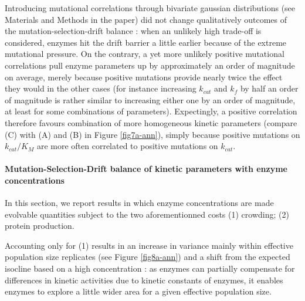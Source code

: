 Introducing mutational correlations through bivariate gaussian distributions (see Materials and Methods in the paper) did not change qualitatively outcomes of the mutation-selection-drift balance : when an unlikely high trade-off is considered, enzymes hit the drift barrier a little earlier because of the extreme mutational pressure. On the contrary, a yet more unlikely positive mutational correlations pull enzyme parameters up by approximately an order of magnitude on average, merely because positive mutations provide nearly twice the effect they would in the other cases (for instance increasing $k_{cat}$ and $k_f$ by half an order of magnitude is rather similar to increasing either one by an order of magnitude, at least for some combinations of parameters). %
Expectingly, a positive correlation therefore favours combination of more homogeneous kinetic parameters (compare (C) with (A) and (B) in Figure \ref{fig7a-ann}), simply because positive mutations on $k_{cat}/K_M$ are more often correlated to positive mutations on $k_{cat}$.

\noindent\paragraph{Mutation-Selection-Drift balance of kinetic parameters with enzyme concentrations\label{sec:MSDBPC}}

In this section, we report results in which enzyme concentrations are made evolvable quantities subject to the two aforementionned costs (1) crowding; (2) protein production.

Accounting only for (1) results in an increase in variance mainly within effective population size replicates (see Figure \ref{fig8a-ann}) and a shift from the expected isocline based on a high concentration : as enzymes can partially compensate for differences in kinetic activities due to kinetic constants of enzymes, it enables enzymes to explore a little wider area for a given effective population size.

